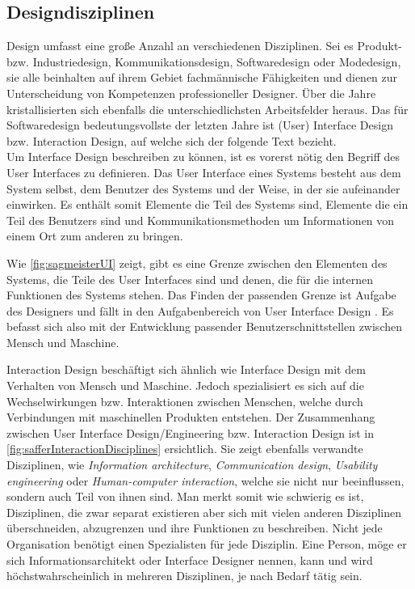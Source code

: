 \subsection{Designdisziplinen} 
Design umfasst eine große Anzahl an verschiedenen Disziplinen. Sei es Produkt- bzw. Industriedesign, Kommunikationsdesign, Softwaredesign oder Modedesign, sie alle beinhalten auf ihrem Gebiet fachmännische Fähigkeiten und dienen zur Unterscheidung von Kompetenzen professioneller Designer. Über die Jahre kristallisierten sich ebenfalls die unterschiedlichsten Arbeitsfelder heraus. Das für Softwaredesign bedeutungsvollste der letzten Jahre ist (User) Interface Design bzw. Interaction Design, auf welche sich der folgende Text bezieht.\\
Um Interface Design beschreiben zu können, ist es vorerst nötig den Begriff des User Interfaces zu definieren. Das User Interface eines Systems besteht aus dem System selbst, dem Benutzer des Systems und der Weise, in der sie aufeinander einwirken. Es enthält somit Elemente die Teil des Systems sind, Elemente die ein Teil des Benutzers sind und Kommunikationsmethoden um Informationen von einem Ort zum anderen zu bringen.

\medskip Wie \autoref{fig:sagmeisterUI} zeigt, gibt es eine Grenze zwischen den Elementen des Systems, die Teile des User Interfaces sind und	denen, die für	die	internen Funktionen des Systems stehen. Das Finden der passenden Grenze ist Aufgabe des	Designers und fällt	in den Aufgabenbereich	von	User Interface Design \citep{Barfield:1993}. Es befasst sich also mit der Entwicklung passender Benutzerschnittstellen zwischen Mensch und Maschine.

\medskip Interaction Design beschäftigt sich ähnlich wie Interface Design mit dem Verhalten von Mensch und Maschine. Jedoch spezialisiert es sich auf die Wechselwirkungen bzw. Interaktionen zwischen Menschen, welche durch Verbindungen mit maschinellen Produkten entstehen. Der Zusammenhang zwischen User Interface Design/Engineering bzw. Interaction Design ist in \autoref{fig:safferInteractionDisciplines} ersichtlich. Sie zeigt ebenfalls verwandte Disziplinen, wie \emph{Information architecture}, \emph{Communication design}, \emph{Usability engineering} oder \emph{Human-computer interaction}, welche sie nicht nur beeinflussen, sondern auch Teil von ihnen sind. Man merkt somit wie schwierig es ist, Disziplinen, die zwar separat existieren aber sich mit vielen anderen Disziplinen überschneiden, abzugrenzen und ihre Funktionen zu beschreiben. Nicht jede Organisation benötigt einen Spezialisten für jede Disziplin. Eine Person, möge er sich Informationsarchitekt oder Interface Designer nennen, kann und wird höchstwahrscheinlich in mehreren Disziplinen, je nach Bedarf tätig sein. \citep{Saffer:2007}

